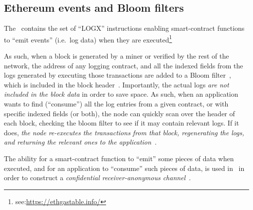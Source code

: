 \subsection{Ethereum events and Bloom filters}\label{sssec:ethereum-events}

The \evm~contains the set of ``LOGX'' instructions enabling smart-contract functions to ``emit events'' (i.e.~log data) when they are executed\footnote{see:\url{https://ethgastable.info/}}

As such, when a block is generated by a miner or verified by the rest of the network, the address of any logging contract, and all the indexed fields from the logs generated by executing those transactions are added to a Bloom filter~\cite{DBLP:journals/cacm/Bloom70}, which is included in the block header~\cite[Section 4.3]{ethyellowpaper}. Importantly, the actual logs \emph{are not included in the block data} in order to save space.
    As such, when an application wants to find (``consume'') all the log entries from a given contract, or with specific indexed fields (or both), the node can quickly scan over the header of each block, checking the bloom filter to see if it may contain relevant logs. If it does, \emph{the node re-executes the transactions from that block, regenerating the logs, and returning the relevant ones to the application}~\cite{eth-bloom-filters}.

\begin{notebox}
    The ability for a smart-contract function to ``emit'' some pieces of data when executed, and for an application to ``consume'' such pieces of data, is used in \zeth~in order to construct a \emph{confidential receiver-anonymous channel}~\cite{DBLP:conf/pet/KohlweissMOTV13}.
\end{notebox}
